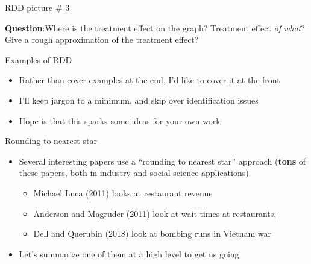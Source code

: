 \documentclass{beamer}
\begin{document}
\begin{frame}{RDD picture \# 3}
	
	\begin{figure}
	\end{figure}

\textbf{Question}:Where is the treatment effect on the graph? Treatment effect \emph{of what}? Give a rough approximation of the treatment effect?
	
	
\end{frame}






\begin{frame}{Examples of RDD}

\begin{itemize}
\item Rather than cover examples at the end, I'd like to cover it at the front
\item I'll keep jargon to a minimum, and skip over identification issues
\item Hope is that this sparks some ideas for your own work
\end{itemize}

\end{frame}


\begin{frame}{Rounding to nearest star}

\begin{itemize}
\item Several interesting papers use a ``rounding to nearest star'' approach (\textbf{tons} of these papers, both in industry and social science applications)
	\begin{itemize}
	\item Michael Luca (2011) looks at restaurant revenue
	\item Anderson and Magruder (2011) look at wait times at restaurants, 
	\item Dell and Querubin (2018) look at bombing runs in Vietnam war
	\end{itemize}
\item Let's summarize one of them at a high level to get us going
\end{itemize}

\end{frame}
\end{document}
